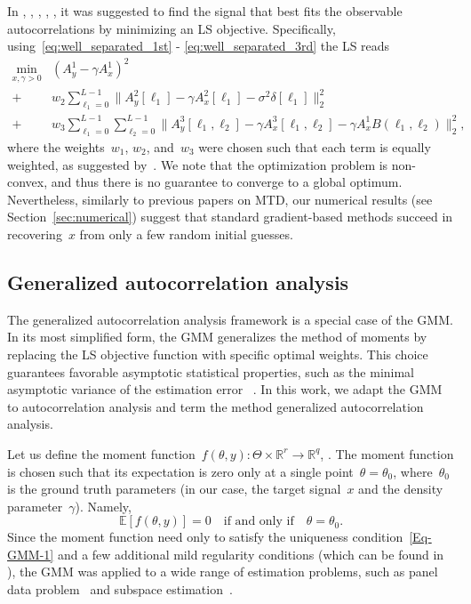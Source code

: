 \documentclass{article}
\newcommand{\rev}[1]{{\color{magenta}{#1}}}
\newcommand{\E}[0]{\mathbb{E}}
\newcommand{\R}[0]{\mathbb{R}}
\begin{document}
In \cite{bendory2019multi}, \cite{lan2020multi}, \cite{marshall2020image}, \cite{bendory2021multi}, \cite{kreymer2021two}, it was suggested to find the signal that best fits the observable autocorrelations by minimizing an LS objective. Specifically, using~\eqref{eq:well_separated_1st} - \eqref{eq:well_separated_3rd} the LS reads
\begin{align}
\label{eq:optimization}
\min_{x, \gamma > 0} & (A_y^1 - \gamma A_x^1)^2 \nonumber\\ +& w_2 \sum_{\ell_1 = 0}^{L - 1} \|A_y^2[\ell_1] - \gamma A_x^2[\ell_1] - \sigma^2 \delta[\ell_1]\|_2^2\nonumber\\ +& w_3 \sum_{\ell_1 = 0}^{L - 1} \sum_{\ell_2 = 0}^{L - 1} \|A_y^3[\ell_1, \ell_2] - \gamma A_x^3[\ell_1, \ell_2] - \gamma A_{x}^1 B(\ell_1, \ell_2)\|_2^2,
\end{align}
where the weights~$w_1$, $w_2$, and~$w_3$ were chosen such that each term is equally weighted, as suggested by~\cite{bendory2019multi}. We note that the optimization problem is non-convex, and thus there is no guarantee to converge to a global optimum. Nevertheless, similarly to previous papers on MTD, our numerical results (see Section~\ref{sec:numerical}) suggest that standard gradient-based methods succeed in recovering~$x$ from only a few random initial guesses.

\subsection{Generalized autocorrelation analysis}
\label{subsec:generalized_ac}
The generalized autocorrelation analysis framework is a special case of the GMM.  In its most simplified form, the GMM generalizes the method of moments by replacing the LS objective function with specific optimal weights. This choice guarantees favorable asymptotic statistical properties, such as the minimal asymptotic variance of the estimation error~\cite{Hansen1982} \rev{(see Section~\ref{gmm:large})}. In this work, we adapt the GMM to autocorrelation analysis and term the method generalized autocorrelation analysis.

Let us define the moment function~\mbox{$f(\theta, y)\colon \Theta \times \R^r \to \R^q$}, \rev{where~$\Theta$ is a compact parameter space}. The moment function is chosen such that its expectation is zero only at a single point~$\theta=\theta_0$, where~$\theta_0$ is the ground truth parameters (in our case, the target signal~$x$ and the density parameter~$\gamma$). Namely,
\begin{equation}\label{Eq-GMM-1}
	\E\left[f(\theta,y)\right] = 0 \quad \text{if and only if} \quad \theta = \theta_0.
\end{equation}
Since the moment function need only to satisfy the uniqueness condition~\eqref{Eq-GMM-1} and a few additional mild regularity conditions (which can be found in~\cite{Hansen1982} \cite{Hall2005} \cite{abas2021generalized}), the GMM was applied to a wide range of estimation problems,  such as panel data problem~\cite{blundell2000gmm} and subspace estimation~\cite{fan2018optimal}.
\end{document}
